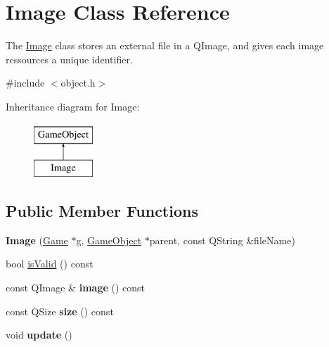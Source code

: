 \hypertarget{class_image}{\section{\-Image \-Class \-Reference}
\label{class_image}
}


\-The \hyperlink{class_image}{\-Image} class stores an external file in a \-Q\-Image, and gives each image ressources a unique identifier.  




{\ttfamily \#include $<$object.\-h$>$}

\-Inheritance diagram for \-Image\-:\begin{figure}[H]
\begin{center}
\leavevmode
\includegraphics[height=2.000000cm]{class_image}
\end{center}
\end{figure}
\subsection*{\-Public \-Member \-Functions}
\begin{DoxyCompactItemize}
\item 
\hypertarget{class_image_a72923e3d24b0bbf9ff836878ea37091e}{{\bfseries \-Image} (\hyperlink{class_game}{\-Game} $\ast$g, \hyperlink{class_game_object}{\-Game\-Object} $\ast$parent, const \-Q\-String \&file\-Name)}\label{class_image_a72923e3d24b0bbf9ff836878ea37091e}

\item 
bool \hyperlink{class_image_a0bc052fef9ea98e416e11af385cd93b4}{is\-Valid} () const 
\item 
\hypertarget{class_image_abad14459f8cc7bea0ce1b9ce1c41bad1}{const \-Q\-Image \& {\bfseries image} () const }\label{class_image_abad14459f8cc7bea0ce1b9ce1c41bad1}

\item 
\hypertarget{class_image_a62eb0299b2a5109afb31321cba7d4fc8}{const \-Q\-Size {\bfseries size} () const }\label{class_image_a62eb0299b2a5109afb31321cba7d4fc8}

\item 
\hypertarget{class_image_aa4f881e18d7b454ca185c05ec8e70b6d}{void {\bfseries update} ()}\label{class_image_aa4f881e18d7b454ca185c05ec8e70b6d}

\end{DoxyCompactItemize}


